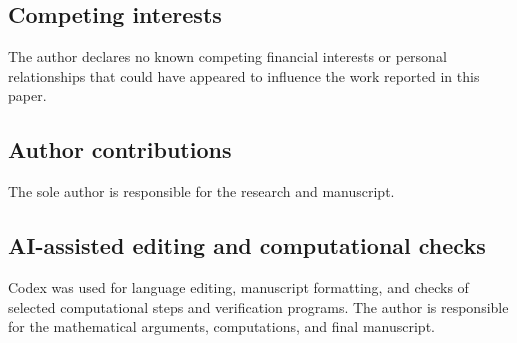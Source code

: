 \documentclass[11pt,a4paper]{article}
\theoremstyle{definition}\newtheorem{definition}[theorem]{Definition}
\theoremstyle{remark}\newtheorem{remark}[theorem]{Remark}
\begin{document}
\subsection*{Competing interests}
The author declares no known competing financial interests or personal relationships that could have appeared to influence the work reported in this paper.

\subsection*{Author contributions}
The sole author is responsible for the research and manuscript.

\subsection*{AI-assisted editing and computational checks}
Codex was used for language editing, manuscript formatting, and checks of selected computational steps and verification programs. The author is responsible for the mathematical arguments, computations, and final manuscript.
\end{document}
